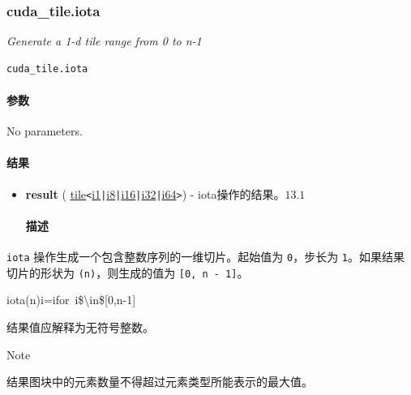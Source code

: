 \documentclass{article}
\begin{document}
\subsubsection{cuda\_tile.iota}

\textit{Generate a 1-d tile range from 0 to n-1}


\begin{lstlisting}
cuda_tile.iota
\end{lstlisting}

\paragraph{参数}

No parameters.



\paragraph{结果}

\begin{itemize}
\item \textbf{result} ( \href{https://docs.nvidia.com/cuda/tile-ir/latest/sections/types.html#type-tile}{tile}\texttt{<}\href{https://docs.nvidia.com/cuda/tile-ir/latest/sections/types.html#subsection-element-types}{i1}\texttt{|}\href{https://docs.nvidia.com/cuda/tile-ir/latest/sections/types.html#subsection-element-types}{i8}\texttt{|}\href{https://docs.nvidia.com/cuda/tile-ir/latest/sections/types.html#subsection-element-types}{i16}\texttt{|}\href{https://docs.nvidia.com/cuda/tile-ir/latest/sections/types.html#subsection-element-types}{i32}\texttt{|}\href{https://docs.nvidia.com/cuda/tile-ir/latest/sections/types.html#subsection-element-types}{i64}\texttt{>}) - iota操作的结果。$\boxed{13.1}$


\paragraph{描述}

\end{itemize}
\texttt{iota} 操作生成一个包含整数序列的一维切片。起始值为 \texttt{0}，步长为 \texttt{1}。如果结果切片的形状为 \texttt{(n)}，则生成的值为 \texttt{[0, n - 1]}。


iota(n)i=ifor i\$\textbackslash{}in\$[0,n-1]

结果值应解释为无符号整数。


Note


结果图块中的元素数量不得超过元素类型所能表示的最大值。
\end{document}
